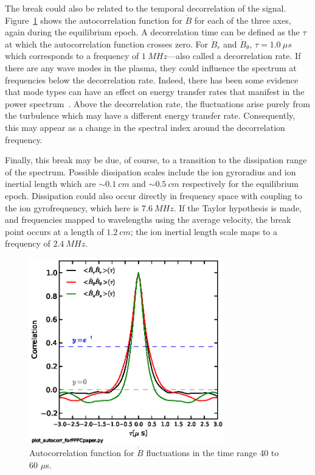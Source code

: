 \documentclass[12pt]{iopart}
\begin{document}
The break could also be related to the temporal decorrelation of the signal. Figure~\ref{fig:autocorr} shows the autocorrelation function for $\dot{B}$ for each of the three axes, again during the equilibrium epoch. A decorrelation time can be defined as the $\tau$ at which the autocorrelation function crosses zero. For $\dot{B}_{r}$ and $\dot{B}_{\theta}$, $\tau = 1.0~\mu s$ which corresponds to a frequency of $1~MHz$---also called a decorrelation rate. If there are any wave modes in the plasma, they could influence the spectrum at frequencies below the decorrelation rate. Indeed, there has been some evidence that mode types can have an effect on energy transfer rates that manifest in the power spectrum~\cite{shaikh09}. Above the decorrelation rate, the fluctuations arise purely from the turbulence which may have a different energy transfer rate. Consequently, this may appear as a change in the spectral index around the decorrelation frequency.

Finally, this break may be due, of course, to a transition to the dissipation range of the spectrum. Possible dissipation scales include the ion gyroradius and ion inertial length which are $\sim 0.1~cm$ and $\sim 0.5~cm$ respectively for the equilibrium epoch. Dissipation could also occur directly in frequency space with coupling to the ion gyrofrequency, which here is $7.6~MHz$. If the Taylor hypothesis is made, and frequencies mapped to wavelengths using the average velocity, the break point occurs at a length of $1.2~cm$; the ion inertial length scale maps to a frequency of $2.4~MHz$.

\begin{figure}[!htbp]
\centerline{
\includegraphics[width=8.5cm]{autocorr.eps}}
\caption{\label{fig:autocorr} Autocorrelation function for $\dot{B}$ fluctuations in the time range 40 to 60 $\mu$s.}
\end{figure}
\end{document}

